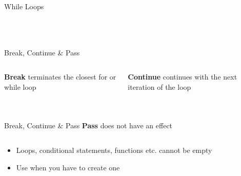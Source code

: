         \begin{frame}{While Loops}
            \begin{columns}
                \begin{column}{0.5\textwidth}
                    \inputminted[frame=single,framesep=2pt]{python3}{code-examples/while1.py}
                \end{column}
               \pause 
                \begin{column}{0.5\textwidth}
                    \inputminted[frame=single,framesep=2pt]{python3}{code-examples/while2.py}
                    \pause
                    \inputminted[frame=single,framesep=2pt]{python3}{code-examples/while3.py}
                \end{column} 
            \end{columns}
        \end{frame}
        \begin{frame}{Break, Continue \& Pass}
            \begin{columns}
                \begin{column}{0.5\textwidth}
                    \textbf{Break}
                    terminates the closest for or while loop
                    \bigskip  
                    \inputminted[frame=single,framesep=2pt]{python3}{code-examples/break1.py}
                    \pause
                    \inputminted[frame=single,framesep=2pt]{python3}{code-examples/break2.py}
                \end{column}
               \pause 
                \begin{column}{0.5\textwidth}
                    \textbf{Continue}
                    continues with the next iteration of the loop
                    \bigskip  
                    \inputminted[frame=single,framesep=2pt]{python3}{code-examples/continue1.py}
                    \pause
                    \inputminted[frame=single,framesep=2pt]{python3}{code-examples/continue2.py}
                \end{column} 
            \end{columns}
        \end{frame}
        
        \begin{frame}{Break, Continue \& Pass}
            \textbf{Pass}
            does not have an effect
            \bigskip  
            \inputminted[frame=single,framesep=2pt]{python3}{code-examples/pass.py}
            \begin{itemize}
                \item Loops, conditional statements, functions etc. cannot be empty 
                \item Use when you have to create one
            \end{itemize}
        \end{frame}

